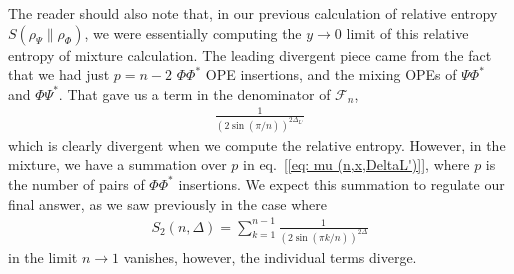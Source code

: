 \documentclass[11pt]{article}
\begin{document}
The reader should also note that, in our previous calculation of relative entropy $S(\rho_\Psi \| \rho_\Phi)$, we were essentially computing the $y \to 0$ limit of this relative entropy of mixture calculation. The leading divergent piece came from the fact that we had just $p=n-2$ $\Phi \Phi^*$ OPE insertions, and the mixing OPEs of $\Psi \Phi^*$ and $\Phi \Psi^*$. That gave us a term in the denominator of $\mathcal{F}_n$,
\begin{align}
    \frac{1}{(2\sin (\pi/n))^{2\Delta_{L'}}}
\end{align}
which is clearly divergent when we compute the relative entropy. However, in the mixture, we have a summation over $p$ in eq.~[\ref{eq: mu (n,x,DeltaL')}], where $p$ is the number of pairs of $\Phi \Phi^*$ insertions. We expect this summation to regulate our final answer, as we saw previously in the case where 
\begin{align}
    S_2(n,\Delta) = \sum_{k=1}^{n-1}\frac{1}{(2\sin(\pi k/n))^{2\Delta}}
\end{align}
in the limit $n\to 1$ vanishes, however, the individual terms diverge. 
\end{document}
